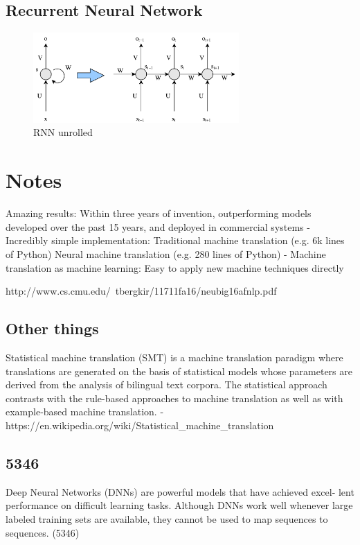 \subsection{Recurrent Neural Network}
\begin{figure}[ht]
    \centering
    \includegraphics[width=0.7\textwidth]{fig/related_work/nn_recurrent.pdf}
    \caption{RNN unrolled}
    \label{fig:nn-rnn}
\end{figure}

\iffalse
\section{Notes}


Amazing results:
Within three years of invention, outperforming models
developed over the past 15 years, and deployed in
commercial systems
- Incredibly simple implementation:
Traditional machine translation (e.g. 6k lines of Python)
Neural machine translation (e.g. 280 lines of Python)
- Machine translation as machine learning:
Easy to apply new machine techniques directly

http://www.cs.cmu.edu/~tbergkir/11711fa16/neubig16afnlp.pdf

\subsection{Other things}
Statistical machine translation (SMT) is a machine translation paradigm where translations are generated on the basis of statistical models whose parameters are derived from the analysis of bilingual text corpora. The statistical approach contrasts with the rule-based approaches to machine translation as well as with example-based machine translation. - https://en.wikipedia.org/wiki/Statistical\_machine\_translation



\subsection{5346}
Deep Neural Networks (DNNs) are powerful models that have achieved excel- lent performance on difficult learning tasks. Although DNNs work well whenever large labeled training sets are available, they cannot be used to map sequences to sequences. (5346)

